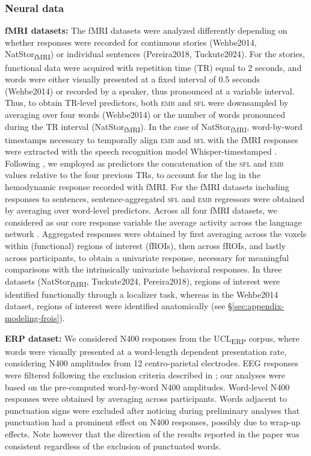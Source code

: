 \documentclass[11pt]{article}
\begin{document}
\subsubsection{Neural data}
\textbf{fMRI datasets:} The fMRI datasets were analyzed differently depending on whether responses were recorded for continuous stories (Wehbe2014, NatStor\textsubscript{fMRI}) or individual sentences (Pereira2018, Tuckute2024). For the stories, functional data were acquired with repetition time (TR) equal to 2 seconds, and words were either visually presented at a fixed interval of 0.5 seconds (Wehbe2014) or recorded by a speaker, thus pronounced at a variable interval. Thus, to obtain TR-level predictors, both \textsc{emb} and \textsc{sfl} were downsampled by averaging over four words (Wehbe2014) or the number of words pronounced during the TR interval (NatStor\textsubscript{fMRI}). In the case of NatStor\textsubscript{fMRI}, word-by-word timestamps necessary to temporally align \textsc{emb} and \textsc{sfl} with the fMRI responses were extracted with the speech recognition model Whisper-timestamped \citep{whisper, whisper-timestamped}. Following \citet{aw2022training}, we employed as predictors the concatenation of the \textsc{sfl} and \textsc{emb} values relative to the four previous TRs, to account for the lag in the hemodynamic response recorded with fMRI. For the fMRI datasets including responses to sentences, sentence-aggregated \textsc{sfl} and \textsc{emb} regressors were obtained by averaging over word-level predictors. Across all four fMRI datasets, we considered as our core response variable the average activity across the language network \citep[see also][]{tuckute2023driving, de2025multilingual}. Aggregated responses were obtained by first averaging across the voxels within (functional) regions of interest (fROIs), then across fROIs, and lastly across participants, to obtain a univariate response, necessary for meaningful comparisons with the intrinsically univariate behavioral responses. In three datasets (NatStor\textsubscript{fMRI}, Tuckute2024, Pereira2018), regions of interest were identified functionally through a localizer task, whereas in the Wehbe2014 dataset, regions of interest were identified anatomically (see §\ref{sec:appendix-modeling-frois}). 

\smallskip 

\textbf{ERP dataset:} We considered N400 responses from the UCL\textsubscript{ERP} corpus, where words were visually presented at a word-length dependent presentation rate, considering N400 amplitudes from 12 centro-parietal electrodes. EEG responses were filtered following the exclusion criteria described in \citet{n400}; our analyses were based on the pre-computed word-by-word N400 amplitudes. Word-level N400 responses were obtained by averaging across participants. Words adjacent to punctuation signs were excluded after noticing during preliminary analyses that punctuation had a prominent effect on N400 responses, possibly due to wrap-up effects. Note however that the direction of the results reported in the paper was consistent regardless of the exclusion of punctuated words.
\end{document}
